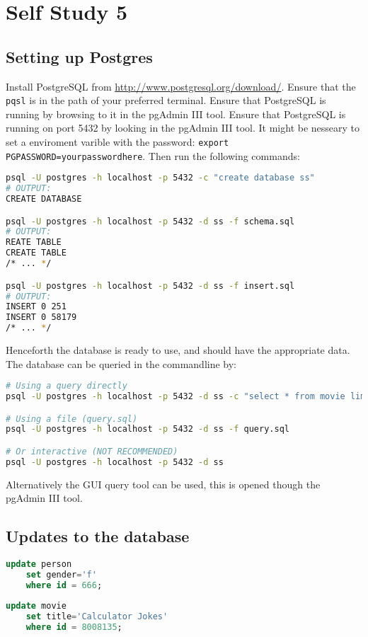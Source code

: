 \documentclass[a4paper,11pt]{memoir}
\begin{document}

\pagestyle{plainnotice}
\part*{Self Study 5}
\chapter{Setting up Postgres}
Install PostgreSQL from \url{http://www.postgresql.org/download/}.
Ensure that the \texttt{pqsl} is in the path of your preferred terminal.
Ensure that PostgreSQL is running by browsing to it in the pgAdmin III tool.
Ensure that PostgreSQL is running on port 5432 by looking in the pgAdmin III tool. 
It might be nesseary to set a enviroment varible with the password: \texttt{export PGPASSWORD=yourpasswordhere}.
Then run the following commands:
\begin{lstlisting}[language=bash]
psql -U postgres -h localhost -p 5432 -c "create database ss"
# OUTPUT:
CREATE DATABASE

psql -U postgres -h localhost -p 5432 -d ss -f schema.sql
# OUTPUT:
REATE TABLE
CREATE TABLE
/* ... */

psql -U postgres -h localhost -p 5432 -d ss -f insert.sql
# OUTPUT:
INSERT 0 251
INSERT 0 58179
/* ... */

\end{lstlisting}

Henceforth the database is ready to use, and should have the appropriate data. 
The database can be queried in the commandline by:
\begin{lstlisting}[language=bash]
# Using a query directly
psql -U postgres -h localhost -p 5432 -d ss -c "select * from movie limit 10;"

# Using a file (query.sql)
psql -U postgres -h localhost -p 5432 -d ss -f query.sql

# Or interactive (NOT RECOMMENDED)
psql -U postgres -h localhost -p 5432 -d ss
\end{lstlisting}
Alternatively the GUI query tool can be used, this is opened though the pgAdmin III tool. 

\chapter{Updates to the database}
\begin{lstlisting}[language=sql]
update person
	set gender='f'
	where id = 666;
\end{lstlisting}
\begin{lstlisting}[language=sql]
update movie
	set title='Calculator Jokes'
	where id = 8008135;
\end{lstlisting}
\end{document}
